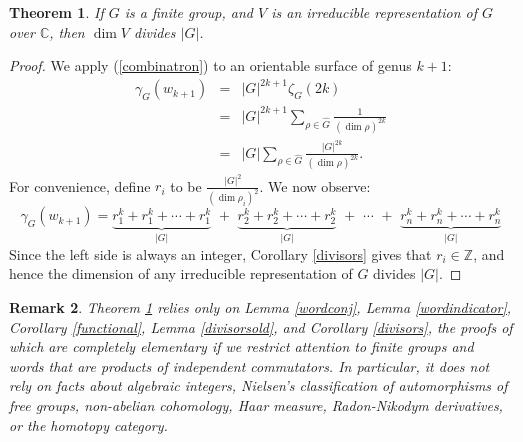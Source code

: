 \documentclass[12pt]{article}
\newtheorem{thm}{Theorem}[section]
\newtheorem{rmk}[thm]{Remark}
\newcommand{\C}{\mathbb{C}}
\newcommand{\be}{\begin{equation}}
\newcommand{\ee}{\end{equation}}
\newcommand{\bea}{\begin{eqnarray}}
\newcommand{\eea}{\end{eqnarray}}
\newcommand{\nn}{\nonumber}
\begin{document}
\begin{thm}\label{classical}
If $G$ is a finite group, and $V$ is an irreducible representation of $G$ over $\C$, then $\dim V$ divides $|G|$.
\end{thm}
\begin{proof}
We apply (\ref{combinatron}) to an orientable surface of genus $k+1$:
\bea
\gamma_G(w_{k+1}) &=& |G|^{2k+1} \zeta_G(2k)\nn\\
                   &=& |G|^{2k+1} \sum_{\rho \in \hat{G}} \frac{1}{(\dim \rho)^{2k}}\nn\\
                   &=& |G| \sum_{\rho \in \hat{G}} \frac{|G|^{2k}}{(\dim \rho)^{2k}}.
\eea
For convenience, define $r_i$ to be $\frac{|G|^2}{(\dim \rho_i)^2}$.  We now observe:
\be 
\gamma_G(w_{k+1}) = \underbrace{r_1^k + r_1^k + \cdots + r_1^k}_{|G|} \,\, + \,\, \underbrace{r_2^k + r_2^k + \cdots + r_2^k}_{|G|} \,\, + \,\, \cdots \,\, + \,\, \underbrace{r_{n}^k + r_n^k + \cdots + r_n^k}_{|G|}
\ee
Since the left side is always an integer, Corollary \ref{divisors} gives that $r_i \in \mathbb{Z}$, and hence the dimension of any irreducible representation of $G$ divides $|G|$.
\end{proof}

\begin{rmk}
Theorem \ref{classical} relies only on Lemma \ref{wordconj}, Lemma \ref{wordindicator}, Corollary \ref{functional}, Lemma \ref{divisorsold}, and Corollary \ref{divisors}, the proofs of which are completely elementary if we restrict attention to finite groups and words that are products of independent commutators.  In particular, it does not rely on facts about algebraic integers, Nielsen's classification of automorphisms of free groups, non-abelian cohomology, Haar measure, Radon-Nikodym derivatives, or the homotopy category.
\end{rmk}

{}

\end{document}
